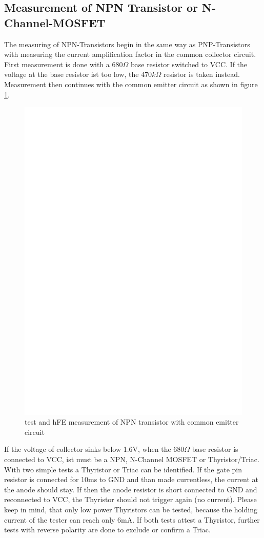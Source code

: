 \subsection{Measurement of NPN Transistor or N-Channel-MOSFET}
The measuring of NPN-Transistors begin in the same way as PNP-Transistors with measuring
the current amplification factor in the common collector circuit.
First measurement is done with a \(680\Omega\) base resistor switched to VCC. If the
voltage at the base resistor ist too low, the \(470k\Omega\) resistor is taken instead.
Measurement then continues with the common emitter circuit as shown in figure \ref{fig:npnce}.
\begin{figure}[H]
\centering
\includegraphics[]{../FIG/NPNce.eps}
\caption{test and hFE measurement of NPN transistor with common emitter circuit }
\label{fig:npnce}
\end{figure}
If the voltage of collector sinks below 1.6V, when the \(680\Omega\) base resistor is connected to VCC,
ist must be a NPN, N-Channel MOSFET or Thyristor/Triac.
With two simple tests a Thyristor or Triac can be identified.
If the gate pin resistor is connected for 10ms to GND and than made currentless, the current
at the anode should stay.
If then the anode resistor is short connected to GND and reconnected to VCC, the Thyristor should not
trigger again (no current).
Please keep in mind, that only low power Thyristors can be tested, because
the holding current of the tester can reach only 6mA.
If both tests attest a Thyristor, further tests with reverse polarity are done
to exclude or confirm a Triac.

